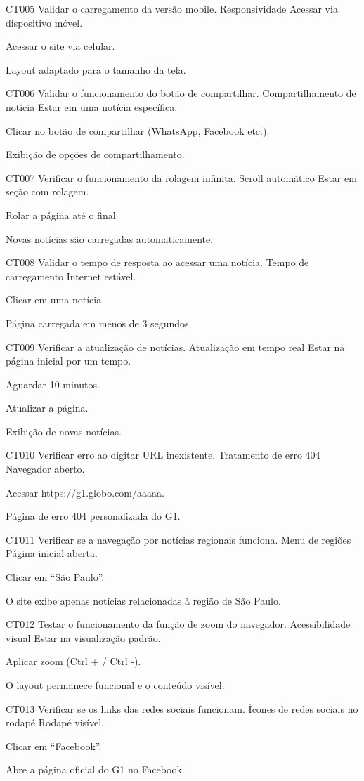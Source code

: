 \documentclass[12pt]{article}
\begin{document}
\casodeteste
{CT005}
{Validar o carregamento da versão mobile.}
{Responsividade}
{Acessar via dispositivo móvel.}
{
\item Acessar o site via celular.
}
{Layout adaptado para o tamanho da tela.}

\casodeteste
{CT006}
{Validar o funcionamento do botão de compartilhar.}
{Compartilhamento de notícia}
{Estar em uma notícia específica.}
{
\item Clicar no botão de compartilhar (WhatsApp, Facebook etc.).
}
{Exibição de opções de compartilhamento.}

\casodeteste
{CT007}
{Verificar o funcionamento da rolagem infinita.}
{Scroll automático}
{Estar em seção com rolagem.}
{
\item Rolar a página até o final.
}
{Novas notícias são carregadas automaticamente.}

\casodeteste
{CT008}
{Validar o tempo de resposta ao acessar uma notícia.}
{Tempo de carregamento}
{Internet estável.}
{
\item Clicar em uma notícia.
}
{Página carregada em menos de 3 segundos.}

\casodeteste
{CT009}
{Verificar a atualização de notícias.}
{Atualização em tempo real}
{Estar na página inicial por um tempo.}
{
\item Aguardar 10 minutos.
\item Atualizar a página.
}
{Exibição de novas notícias.}

\casodeteste
{CT010}
{Verificar erro ao digitar URL inexistente.}
{Tratamento de erro 404}
{Navegador aberto.}
{
\item Acessar https://g1.globo.com/aaaaa.
}
{Página de erro 404 personalizada do G1.}

\casodeteste
{CT011}
{Verificar se a navegação por notícias regionais funciona.}
{Menu de regiões}
{Página inicial aberta.}
{
\item Clicar em “São Paulo”.
}
{O site exibe apenas notícias relacionadas à região de São Paulo.}

\casodeteste
{CT012}
{Testar o funcionamento da função de zoom do navegador.}
{Acessibilidade visual}
{Estar na visualização padrão.}
{
\item Aplicar zoom (Ctrl + / Ctrl -).
}
{O layout permanece funcional e o conteúdo visível.}

\casodeteste
{CT013}
{Verificar se os links das redes sociais funcionam.}
{Ícones de redes sociais no rodapé}
{Rodapé visível.}
{
\item Clicar em “Facebook”.
}
{Abre a página oficial do G1 no Facebook.}
\end{document}
